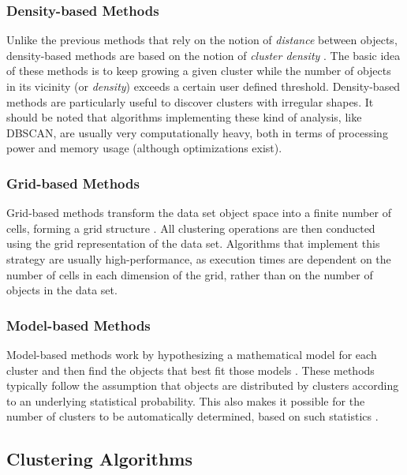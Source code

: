 \subsubsection*{Density-based Methods}

Unlike the previous methods that rely on the notion of \emph{distance} between
objects, density-based methods are based on the notion of \emph{cluster density}
\cite{han2006data}. The basic idea of these methods is to keep growing a given
cluster while the number of objects in its vicinity (or \emph{density}) exceeds
a certain user defined threshold. Density-based methods are particularly useful
to discover clusters with irregular shapes. It should be noted that algorithms
implementing these kind of analysis, like DBSCAN, are usually very
computationally heavy, both in terms of processing power and memory usage
(although optimizations exist).

\subsubsection*{Grid-based Methods}

Grid-based methods transform the data set object space into a finite number of
cells, forming a grid structure
\cite{han2006data,DBLP:journals/corr/abs-1205-1117}. All clustering operations
are then conducted using the grid representation of the data set. Algorithms
that implement this strategy are usually high-performance, as execution times
are dependent on the number of cells in each dimension of the grid, rather than
on the number of objects in the data set.

\subsubsection*{Model-based Methods}

Model-based methods work by hypothesizing a mathematical model for each cluster
and then find the objects that best fit those models
\cite{DBLP:journals/corr/abs-1205-1117}. These methods typically follow the
assumption that objects are distributed by clusters according to an underlying
statistical probability. This also makes it possible for the number of clusters
to be automatically determined, based on such statistics \cite{han2006data}.

\subsection{Clustering Algorithms}\label{sec:clusteralgo}

